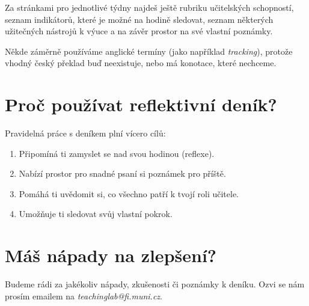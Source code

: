 Za stránkami pro jednotlivé týdny najdeš ještě rubriku učitelských schopností, seznam indikátorů, které je možné na hodině sledovat, seznam některých užitečných nástrojů k výuce a na závěr prostor na své vlastní poznámky.

Někde záměrně používáme anglické termíny (jako například \textit{tracking}), protože vhodný český překlad buď neexistuje, nebo má konotace, které nechceme.

\section*{Proč používat reflektivní deník?}

Pravidelná práce s deníkem plní vícero cílů:
\begin{enumerate}[topsep=0pt]
\item Připomíná ti zamyslet se nad svou hodinou (reflexe).
\item Nabízí prostor pro snadné psaní si poznámek pro příště.
\item Pomáhá ti uvědomit si, co všechno patří k tvojí roli učitele.
\item Umožňuje ti sledovat svůj vlastní pokrok.
\end{enumerate}

\section*{Máš nápady na zlepšení?}

Budeme rádi za jakékoliv nápady, zkušenosti či poznámky k deníku. Ozvi se nám prosím emailem na \textit{teachinglab@fi.muni.cz}.
